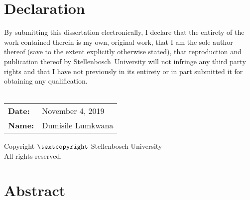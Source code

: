 \TitlePage

\chapter{Declaration}
By submitting this dissertation electronically, I declare that the entirety of the work contained therein is my own, original work, that I am the sole author thereof (save to the extent explicitly otherwise stated), that reproduction and publication thereof by \mbox{Stellenbosch University} will not infringe any third party rights and that I have not \mbox{previously} in its entirety or in part submitted it for obtaining any qualification. \\ \\

\noindent
\begin{tabular}{@{}ll}
\textbf{Date:} & November 4, 2019 \\ 
\textbf{Name:} & Dumisile Lumkwana \\ 
\end{tabular}

\vspace*{\fill}
\begin{center}
Copyright $\textcopyright$ Stellenbosch University \\
All rights reserved.
\end{center}

\chapter{Abstract}

